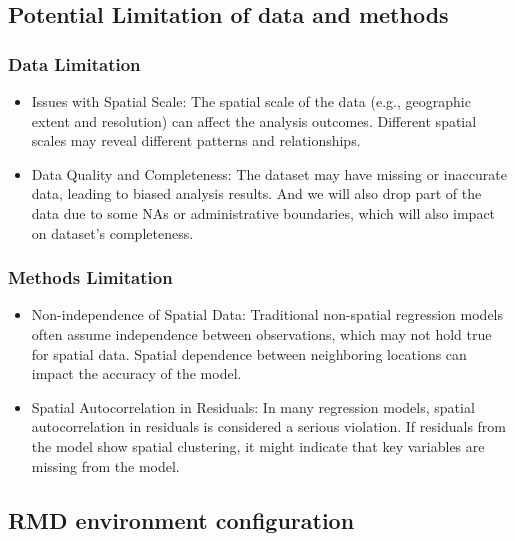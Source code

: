 \documentclass[
]{article}
\begin{document}
\hypertarget{potential-limitation-of-data-and-methods}{%
\subsection{Potential Limitation of data and
methods}\label{potential-limitation-of-data-and-methods}}

\hypertarget{data-limitation}{%
\subsubsection{Data Limitation}\label{data-limitation}}

\begin{itemize}
\item
  Issues with Spatial Scale: The spatial scale of the data (e.g.,
  geographic extent and resolution) can affect the analysis outcomes.
  Different spatial scales may reveal different patterns and
  relationships.
\item
  Data Quality and Completeness: The dataset may have missing or
  inaccurate data, leading to biased analysis results. And we will also
  drop part of the data due to some NAs or administrative boundaries,
  which will also impact on dataset's completeness.
\end{itemize}

\hypertarget{methods-limitation}{%
\subsubsection{Methods Limitation}\label{methods-limitation}}

\begin{itemize}
\item
  Non-independence of Spatial Data: Traditional non-spatial regression
  models often assume independence between observations, which may not
  hold true for spatial data. Spatial dependence between neighboring
  locations can impact the accuracy of the model.
\item
  Spatial Autocorrelation in Residuals: In many regression models,
  spatial autocorrelation in residuals is considered a serious
  violation. If residuals from the model show spatial clustering, it
  might indicate that key variables are missing from the model.
\end{itemize}

\hypertarget{rmd-environment-configuration}{%
\subsection{RMD environment
configuration}\label{rmd-environment-configuration}}
\end{document}
